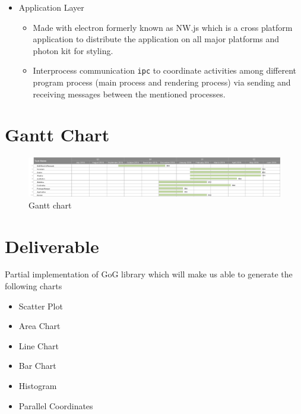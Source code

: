 \documentclass[12pt]{article}
\begin{document}
\begin{itemize}
\begin{itemize}
\begin{itemize}
\item Usage
\begin{itemize}
\item Add Or Update a plugin.
\begin{equation*}
vispack \hspace{3} install \hspace{3} plugin\_name \nonumber
\end{equation*}
\item Remove a plugin
\begin{equation*}
vispack \hspace{3} remove \hspace{3} plugin\_name \nonumber
\end{equation*}
\end{itemize}

\end{itemize}
\item {\Large Application Layer}
\begin{itemize}
\item Made with electron formerly known as NW.js which is a cross platform application to distribute the application on all major platforms and photon kit for styling.
\item Interprocess communication \texttt{ipc} to coordinate activities among different program process (main process and rendering process) via sending and  receiving messages between the mentioned processes.
\end{itemize}
\end{itemize}


\section{Gantt Chart}
\begin{figure}[h!]
\caption{Gantt chart}
\includegraphics[width=\textwidth]{gantt}

\end{figure}

\pagebreak

\section{Deliverable}
Partial implementation of GoG library which will make us able to generate the following charts
\begin{itemize}
\item Scatter Plot
\item Area Chart
\item Line Chart
\item Bar Chart
\item Histogram
\item Parallel Coordinates
\end{itemize}



\end{itemize}
\end{document}
